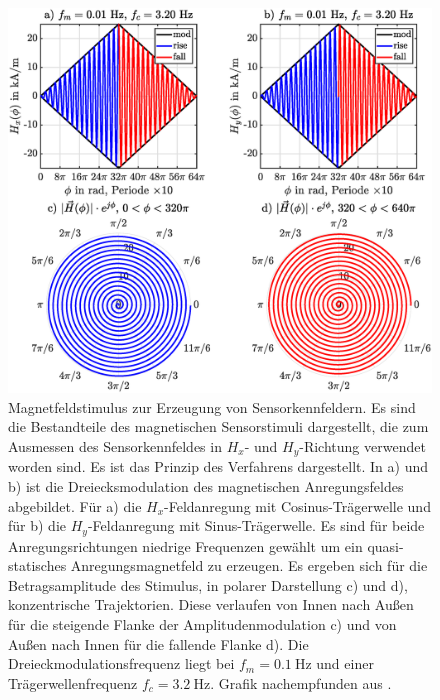 	
	\clearpage
	\begin{figure}[tbph]
		\centering
		\includegraphics[width=\linewidth]{chapters/images/Magnetfeldstimulus_Kennfeldmethode}
		\caption[Magnetfeldstimulus zur Erzeugung von Sensorkennfeldern]{Magnetfeldstimulus zur Erzeugung von 
		Sensorkennfeldern. Es sind die Bestandteile des magnetischen Sensorstimuli dargestellt, die zum Ausmessen des 
		Sensorkennfeldes in $H_x$- und $H_y$-Richtung verwendet worden sind. Es ist das Prinzip des Verfahrens 
		dargestellt. In a) und b) ist die Dreiecksmodulation des magnetischen Anregungsfeldes abgebildet. Für a) die 
		$H_x$-Feldanregung mit Cosinus-Trägerwelle und für b) die $H_y$-Feldanregung mit Sinus-Trägerwelle. Es sind für 
		beide Anregungsrichtungen niedrige Frequenzen gewählt um ein quasi-statisches Anregungsmagnetfeld zu erzeugen. 
		Es ergeben sich für die Betragsamplitude des Stimulus, in polarer Darstellung c) und d), konzentrische 
		Trajektorien. Diese verlaufen von Innen nach Außen für die steigende Flanke der Amplitudenmodulation c) und von 
		Außen nach Innen für die fallende Flanke d). Die Dreieckmodulationsfrequenz liegt bei $f_m = \SI{0.1}{\hertz}$ 
		und einer Trägerwellenfrequenz $f_c = \SI{3.2}{\hertz}$. Grafik nachempfunden aus \cite{Schuethe2019}.}
		\label{fig:magnetfeldstimuluskennfeldmethode}
	\end{figure}
	
